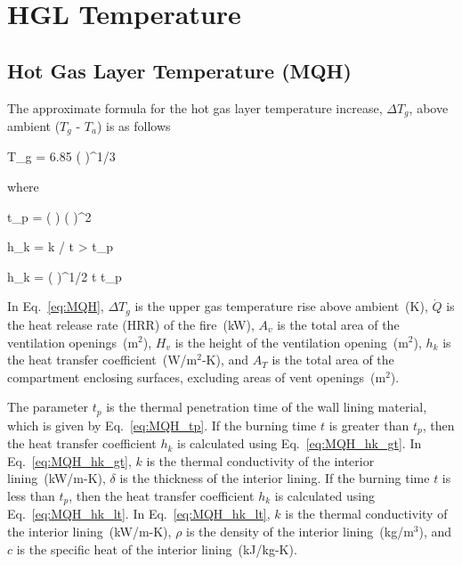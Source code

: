 \chapter{HGL Temperature}
\label{HGL:Chapter}

\section{Hot Gas Layer Temperature (MQH)}

The approximate formula for the hot gas layer temperature increase, $\Delta T_g$, above ambient ($T_g$ - $T_a$) is as follows

\be
\Delta T_g = 6.85 \left(  \right)^{1/3}
\label{eq:MQH}
\ee

\noindent where

\be
t_p = \left(  \right) \left(  \right)^2
\label{eq:MQH_tp}
\ee

\be
h_k = k / \delta {} t > t_p
\label{eq:MQH_hk_gt}
\ee

\be
h_k = \left(  \right)^{1/2}  t \le t_p
\label{eq:MQH_hk_lt}
\ee

In Eq.~\ref{eq:MQH}, $\Delta T_g$ is the upper gas temperature rise above ambient~(K), $\dot Q$ is the heat release rate (HRR) of the fire~(kW), $A_v$ is the total area of the ventilation openings~(m$^2$), $H_v$ is the height of the ventilation opening~(m$^2$), $h_k$ is the heat transfer coefficient~(W/m$^2$-K), and $A_T$ is the total area of the compartment enclosing surfaces, excluding areas of vent openings~(m$^2$). 

The parameter $t_p$ is the thermal penetration time of the wall lining material, which is given by Eq.~\ref{eq:MQH_tp}. If the burning time $t$ is greater than $t_p$, then the heat transfer coefficient $h_k$ is calculated using Eq.~\ref{eq:MQH_hk_gt}. In Eq.~\ref{eq:MQH_hk_gt}, $k$ is the thermal conductivity of the interior lining~(kW/m-K), $\delta$ is the thickness of the interior lining. If the burning time $t$ is less than $t_p$, then the heat transfer coefficient $h_k$ is calculated using Eq.~\ref{eq:MQH_hk_lt}. In Eq.~\ref{eq:MQH_hk_lt}, $k$ is the thermal conductivity of the interior lining~(kW/m-K), $\rho$ is the density of the interior lining~(kg/m$^3$), and $c$ is the specific heat of the interior lining~(kJ/kg-K).

%
%
%
%

